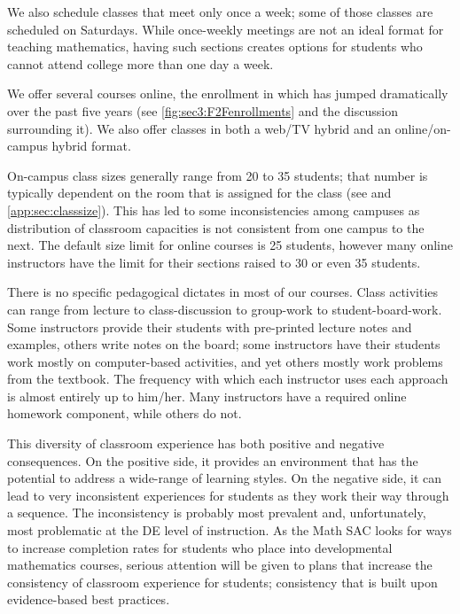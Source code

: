 We also schedule classes that meet only once a week; some of those classes are
scheduled on  Saturdays.   While once-weekly meetings are not an ideal format for
teaching mathematics, having such sections creates options for students who
cannot attend college more than one day a week.  

We offer several courses online, the enrollment in which has jumped
dramatically over the past five years (see \vref{fig:sec3:F2Fenrollments} and the discussion
surrounding it).  We also offer classes in both a web/TV hybrid and an online/on-campus hybrid format.

On-campus class sizes generally range from 20 to 35 students; that number is
typically dependent on the room that is assigned for the class (see  and 
\vref{app:sec:classsize}).  This has led
to some inconsistencies among campuses as distribution of classroom capacities
is not consistent from one campus to the next.   The default size limit for
online courses is 25 students,  however many online instructors have the limit
for their sections raised to 30 or even 35 students. 

There is no specific pedagogical dictates in most of our courses.  Class
activities can range from lecture to class-discussion to group-work to
student-board-work. Some instructors provide their students with pre-printed
lecture notes and examples, others write notes on the board; some instructors
have their students work mostly on computer-based activities, and yet others
mostly work problems from the textbook. The frequency with which each
instructor uses each approach is almost entirely up to him/her.  Many
instructors have a required online homework component, while others do not.

This diversity of classroom experience has both positive and negative
consequences.  On the positive side, it provides an environment that has the
potential to address a wide-range of learning styles.  On the negative side, it
can lead to very inconsistent experiences for students as they work their way
through a sequence.  The inconsistency is probably most prevalent and,
unfortunately, most  problematic at the DE level of instruction.  
As the Math SAC looks for ways to increase completion rates for students who
place into developmental mathematics courses, serious attention will be given
to plans that increase the consistency of classroom experience for students;
consistency that is built upon evidence-based best practices.
